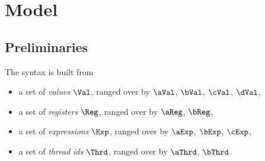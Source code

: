


\section{Model}
\label{sec:model}

\subsection{Preliminaries}
\label{sec:prelim}
The syntax is built from
\begin{itemize}
\item a set of \emph{values} $\Val$, ranged over by
  $\aVal$, $\bVal$, $\cVal$, $\dVal$,
\item a set of \emph{registers} $\Reg$, ranged over by
  $\aReg$, $\bReg$,
\item a set of \emph{expressions} $\Exp$, ranged over by
  $\aExp$, $\bExp$,  $\cExp$,
\item a set of \emph{thread ids} $\Thrd$, ranged over by
  $\aThrd$, $\bThrd$.
\end{itemize}

